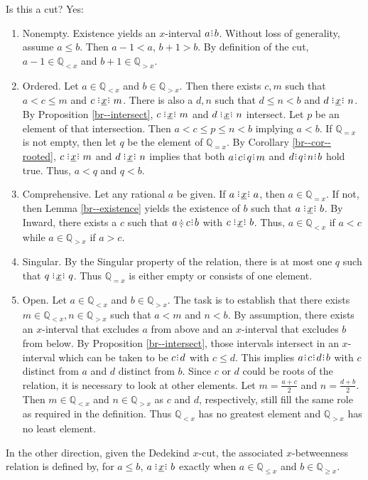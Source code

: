 \documentclass[12pt]{article}
\newcommand{\qcut}[2][x]{\ensuremath{\mathbb{Q}_{#2 #1}}}
\newcommand{\qlt}[1][x]{\qcut[#1]{<}}
\newcommand{\qeq}[1][x]{\qcut[#1]{=}}
\newcommand{\qgt}[1][x]{\qcut[#1]{>}}
\newcommand{\qgeq}[1][x]{\qcut[#1]{\geq}}
\newcommand{\qleq}[1][x]{\qcut[#1]{\leq}}
\begin{document}
Is this a cut? Yes: 
\begin{enumerate}
    \item Nonempty. Existence yields an $x$-interval $a \rint b$. Without loss of generality, assume $a \leq b$. Then $a-1< a$, $b+1 > b$. By definition of the cut, $a-1 \in \qlt$ and $b+1 \in \qgt$.
    \item Ordered. Let $a \in \qlt$ and $b \in \qgt$.  Then there exists $c, m$ such that $a < c \leq m$ and $c \xrel m$. There is also a $d, n$ such that $d \leq n < b$  and $d \xrel n$. By Proposition \ref{br--intersect}, $c \xrel m$ and $d \xrel n$ intersect. Let $p$ be an element of that intersection. Then $a < c \leq p \leq n < b$ implying $a < b$.  If $\qeq$ is not empty, then let $q$ be the element of $\qeq$. By Corollary \ref{br--cor--rooted}, $c \xrel m$ and $d \xrel n$ implies that both $a\rint c\rint q\rint m$ and $d\rint q\rint n\rint b$ hold true. Thus, $a < q$ and $q < b$.  
    \item Comprehensive. Let any rational $a$ be given. If $a \xrel a$, then $a \in \qeq$. If not, then Lemma \ref{br--existence} yields the existence of $b$ such that $a \xrel b$. By Inward, there exists a $c$ such that $a\betneq c\rint b$ with $c \xrel b$. Thus, $a \in \qlt$ if $a < c$ while $a  \in \qgt$ if $a > c$. 
    \item Singular. By the Singular property of the relation, there is at most one $q$ such that $q \xrel q$. Thus $\qeq$ is either empty or consists of one element. 
    \item Open. Let $a\in \qlt$ and $b \in \qgt$. The task is to establish that there exists $m \in \qlt, n \in \qgt$ such that $a < m$ and $n < b$. By assumption, there exists an $x$-interval that excludes $a$ from above and an $x$-interval that excludes $b$ from below. By Proposition \ref{br--intersect}, those intervals intersect in an $x$-interval which can be taken to be $c\rint d$ with $c \leq d$. This implies $a\rint c\rint d\rint b$ with $c$ distinct from $a$ and $d$ distinct from $b$. Since $c$ or $d$ could be roots of the relation, it is necessary to look at other elements. Let $m = \frac{a+c}{2}$ and $n = \frac{d+b}{2}$. Then $m \in \qlt$ and $n \in \qgt$ as $c$ and $d$, respectively, still fill the same role as required in the definition. Thus $\qlt$ has no greatest element and $\qgt$ has no least element. 
\end{enumerate}

In the other direction, given the Dedekind $x$-cut, the associated $x$-betweenness relation is defined by, for $a \leq b$, $a \xrel b$ exactly when $a \in \qleq$ and $b \in \qgeq$. 
\end{document}

